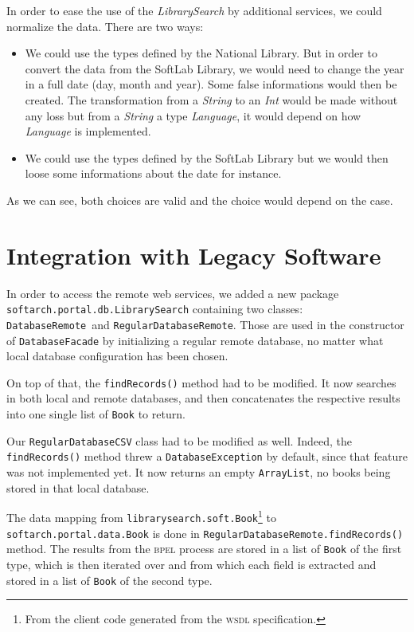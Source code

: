 \documentclass[a4paper,10pt]{article}
\begin{document}
 In order to ease the use of the \textit{LibrarySearch} by additional services, we could normalize the data. There are two ways:
 \begin{itemize}
  \item We could use the types defined by the National Library. But in order to convert the data from the SoftLab Library, we would need to change the year in a full date (day, month and year).
  Some false informations would then be created. The transformation from a \textit{String} to an \textit{Int} would be made without any loss but from a \textit{String} a type \textit{Language}, it would depend on 
  how \textit{Language} is implemented.
  \item We could use the types defined by the SoftLab Library but we would then loose some informations about the date for instance.
 \end{itemize}
 
 As we can see, both choices are valid and the choice would depend on the case.



\section{Integration with Legacy Software}
In order to access the remote web services, we added a new package \texttt{softarch.portal.db.LibrarySearch} containing two classes: \texttt{DatabaseRemote} and \texttt{RegularDatabaseRemote}.
Those are used in the constructor of \texttt{DatabaseFacade} by initializing a regular remote database, no matter what local database configuration has been chosen.

On top of that, the \texttt{findRecords()} method had to be modified.
It now searches in both local and remote databases, and then concatenates the respective results into one single list of \texttt{Book} to return.

Our \texttt{RegularDatabaseCSV} class had to be modified as well.
Indeed, the \texttt{findRecords()} method threw a \texttt{DatabaseException} by default, since that feature was not implemented yet.
It now returns an empty \texttt{ArrayList}, no books being stored in that local database.

The data mapping from \texttt{librarysearch.soft.Book}\footnote{From the client code generated from the \textsc{wsdl} specification.} to \texttt{softarch.portal.data.Book} is done in \texttt{RegularDatabaseRemote.findRecords()} method.
The results from the \textsc{bpel} process are stored in a list of \texttt{Book} of the first type, which is then iterated over and from which each field is extracted and stored in a list of \texttt{Book} of the second type.
\end{document}
